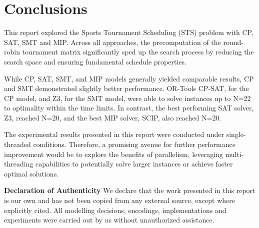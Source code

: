 \section{Conclusions}
This report explored the Sports Tournament Scheduling (STS) problem with CP, SAT, SMT and MIP. Across all approaches, the precomputation of the round-robin tournament matrix significantly sped up the search process by reducing the search space and ensuring fundamental schedule properties.

While CP, SAT, SMT, and MIP models generally yielded comparable results, CP and SMT demonstrated slightly better performance. OR-Tools CP-SAT, for the  CP model, and Z3, for the SMT model, were able to solve instances up to N=22 to optimality within the time limits. In contrast, the best performing SAT solver, Z3, reached N=20, and the best MIP solver, SCIP, also reached N=20.

The experimental results presented in this report were conducted under single-threaded conditions. Therefore, a promising avenue for further performance improvement would be to explore the benefits of parallelism, leveraging multi-threading capabilities to potentially solve larger instances or achieve faster optimal solutions.

\noindent\textbf{Declaration of Authenticity}
We declare that the work presented in this report is our own and has not been copied from any external source, except where explicitly cited. All modelling decisions, encodings, implementations and experiments were carried out by us without unauthorized assistance.
